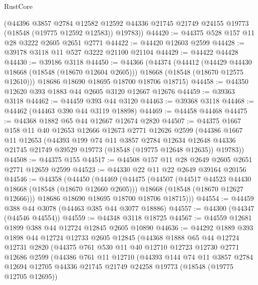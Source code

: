 \begin{lexlean}{RustCore}
\begin{coremodule}
      (@44396
        @3857
        @2784
        @12582
        @12592
        @44336
        @21745
        @21749
        @24155
        @19773
        (@18548 (@19775 @12592 @12583))
        @19783))
@44420 := @44375 @528 @157 @11 @28 @3222 @2605 @2651 @2771
@44422 := @44420 @12603 @2599
@44428 := @39178 @3118 @11 @527 @3222 @21100 @21104
@44429 := @44422 @44428
@44430 := @39186 @3118
@44450 := @44366
    (@44374
      (@44412
        (@44429 @44430 @18668 (@18548 (@18670 @12604 @2605)))
        @18668
        (@18548 (@18670 @12575 @12610)))
      @18686
      @18690
      @18695
      @18700
      @18706
      @18715)
@44458 := @44350 @12620 @393 @1883 @44 @2605 @3120 @12667 @12676
@44459 := @39363 @3118
@44462 := @44459 @393 @44 @3120
@44463 := @39368 @3118
@44468 := @44462 (@44463 @390 @44 @3119 @18898)
@44469 := @44458 @44468
@44475 := @44368 @1882 @65 @44 @12667 @12674 @2820
@44507 := @44375
    @1667
    @158
    @11
    @40
    @12653
    @12666
    @12673
    @2771
    @12626
    @2599
    (@44386
      @1667
      @11
      @12653
      (@44393
        @199
        @74
        @11
        @3857
        @2784
        @12634
        @12648
        @44336
        @21745
        @21749
        @39529
        @19773
        (@18548 (@19775 @12648 @12635))
        @19783))
@44508 := @44375 @155
@44517 := @44508 @157 @11 @28 @2649 @2605 @2651 @2771 @12659 @2599
@44523 := @44330 @22 @11 @22 @2649 @39164 @20156
@44546 := @44358
    (@44450
      (@44469
        (@44475
          (@44507
            (@44517 @44523 @44430 @18668 (@18548 (@18670 @12660 @2605)))
            @18668
            (@18548 (@18670 @12627 @12666)))
          @18686
          @18690
          @18695
          @18700
          @18706
          @18715)))
@44554 := @44459 @388 @44 @3078 (@44463 @385 @44 @3077 @18886)
@44557 := @44300 (@44347 (@44546 @44554))
@44559 := @44348 @3118 @18725
@44567 := @44559 @12681 @1899 @388 @44 @12724 @12845 @2605 @10890
@44636 := @44292
    @1889
    @393
    @1898
    @44
    @12724
    @12733
    @2605
    @12845
    (@44368
      @1888
      @65
      @44
      @12724
      @12731
      @2820
      (@44375
        @761
        @530
        @11
        @40
        @12710
        @12723
        @12730
        @2771
        @12686
        @2599
        (@44386
          @761
          @11
          @12710
          (@44393
            @144
            @74
            @11
            @3857
            @2784
            @12694
            @12705
            @44336
            @21745
            @21749
            @24258
            @19773
            (@18548 (@19775 @12705 @12695))

\end{coremodule}
\end{lexlean}
